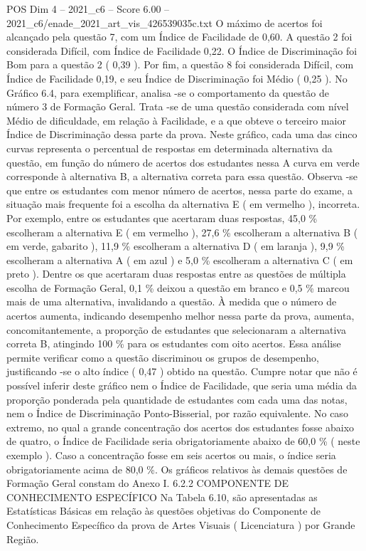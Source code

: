 \begin{textsample}{POS Dim 4 – 2021\_c6 – Score 6.00 – 2021\_c6/enade\_2021\_art\_vis\_426539035c.txt}
O máximo de acertos foi alcançado pela questão 7, com um Índice de Facilidade de 0,60.
A questão 2 foi considerada Difícil, com Índice de Facilidade 0,22.
O Índice de Discriminação foi Bom para a questão 2 ( 0,39 ).
Por fim, a questão 8 foi considerada Difícil, com Índice de Facilidade 0,19, e seu Índice de Discriminação foi Médio ( 0,25 ).
No Gráfico 6.4, para exemplificar, analisa -se o comportamento da questão de número 3 de Formação Geral.
Trata -se de uma questão considerada com nível Médio de dificuldade, em relação à Facilidade, e a que obteve o terceiro maior Índice de Discriminação dessa parte da prova.
Neste gráfico, cada uma das cinco curvas representa o percentual de respostas em determinada alternativa da questão, em função do número de acertos dos estudantes nessa A curva em verde corresponde à alternativa B, a alternativa correta para essa questão.
Observa -se que entre os estudantes com menor número de acertos, nessa parte do exame, a situação mais frequente foi a escolha da alternativa E ( em vermelho ), incorreta.
Por exemplo, entre os estudantes que acertaram duas respostas, 45,0 \% escolheram a alternativa E ( em vermelho ), 27,6 \% escolheram a alternativa B ( em verde, gabarito ), 11,9 \% escolheram a alternativa D ( em laranja ), 9,9 \% escolheram a alternativa A ( em azul ) e 5,0 \% escolheram a alternativa C ( em preto ).
Dentre os que acertaram duas respostas entre as questões de múltipla escolha de Formação Geral, 0,1 \% deixou a questão em branco e 0,5 \% marcou mais de uma alternativa, invalidando a questão.
À medida que o número de acertos aumenta, indicando desempenho melhor nessa parte da prova, aumenta, concomitantemente, a proporção de estudantes que selecionaram a alternativa correta B, atingindo 100 \% para os estudantes com oito acertos.
Essa análise permite verificar como a questão discriminou os grupos de desempenho, justificando -se o alto índice ( 0,47 ) obtido na questão.
Cumpre notar que não é possível inferir deste gráfico nem o Índice de Facilidade, que seria uma média da proporção ponderada pela quantidade de estudantes com cada uma das notas, nem o Índice de Discriminação Ponto-Bisserial, por razão equivalente.
No caso extremo, no qual a grande concentração dos acertos dos estudantes fosse abaixo de quatro, o Índice de Facilidade seria obrigatoriamente abaixo de 60,0 \% ( neste exemplo ).
Caso a concentração fosse em seis acertos ou mais, o índice seria obrigatoriamente acima de 80,0 \%.
Os gráficos relativos às demais questões de Formação Geral constam do Anexo I. 6.2.2 COMPONENTE DE CONHECIMENTO ESPECÍFICO Na Tabela 6.10, são apresentadas as Estatísticas Básicas em relação às questões objetivas do Componente de Conhecimento Específico da prova de Artes Visuais ( Licenciatura ) por Grande Região.

\end{textsample}
